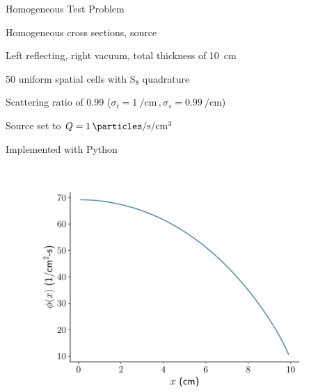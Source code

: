 \documentclass[10pt]{beamer}
\begin{document}
\begin{frame}{Homogeneous Test Problem}

	Homogeneous cross sections, source

	Left reflecting, right vacuum, total thickness of \SI{10}{cm}

	50 uniform spatial cells with S$_8$ quadrature 

	Scattering ratio of 0.99 ($\sigma_t = \SI{1}{\per\cm}\,, \sigma_s = \SI{0.99}{\per\cm}$)

	Source set to $Q = \SI{1}{\particles\per\second\per\cm\cubed}$

	Implemented with Python

	\vspace{-.1in}
	\begin{figure}
		\centering
		\includegraphics[width=.5\textwidth]{figs/phi_solution.pdf}
	\end{figure}

\end{frame}
\end{document}
